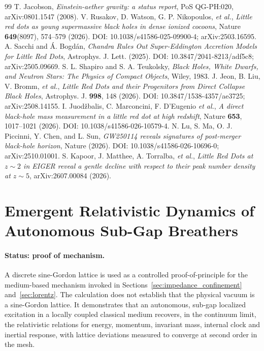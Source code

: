 \documentclass[11pt,a4paper]{article}
\theoremstyle{plain}
\theoremstyle{remark}
\begin{document}
\begin{thebibliography}{99}
 T. Jacobson, \emph{Einstein-aether gravity: a status report}, PoS QG-PH:020, arXiv:0801.1547 (2008).
 V. Rusakov, D. Watson, G. P. Nikopoulos, \emph{et al.}, \emph{Little red dots as young supermassive black holes in dense ionized cocoons}, Nature \textbf{649}(8097), 574--579 (2026). DOI: 10.1038/s41586-025-09900-4; arXiv:2503.16595.
 A. Sacchi and \'A. Bogd\'an, \emph{Chandra Rules Out Super-Eddington Accretion Models for Little Red Dots}, Astrophys. J. Lett. (2025). DOI: 10.3847/2041-8213/adf5c8; arXiv:2505.09669.
 S. L. Shapiro and S. A. Teukolsky, \textit{Black Holes, White Dwarfs, and Neutron Stars: The Physics of Compact Objects}, Wiley, 1983.
 J. Jeon, B. Liu, V. Bromm, \emph{et al.}, \emph{Little Red Dots and their Progenitors from Direct Collapse Black Holes}, Astrophys. J. \textbf{998}, 148 (2026). DOI: 10.3847/1538-4357/ae3725; arXiv:2508.14155.
 I. Juod\v{z}balis, C. Marconcini, F. D'Eugenio \emph{et al.}, \emph{A direct black-hole mass measurement in a little red dot at high redshift}, Nature \textbf{653}, 1017--1021 (2026). DOI: 10.1038/s41586-026-10579-4.
 N. Lu, S. Ma, O. J. Piccinni, Y. Chen, and L. Sun, \emph{GW250114 reveals signatures of post-merger black-hole horizon}, Nature (2026). DOI: 10.1038/s41586-026-10696-0; arXiv:2510.01001.
 S. Kapoor, J. Matthee, A. Torralba, \emph{et al.}, \emph{Little Red Dots at $z\sim2$ in EIGER reveal a gentle decline with respect to their peak number density at $z\sim5$}, arXiv:2607.00084 (2026).
\end{thebibliography}

\section{Emergent Relativistic Dynamics of Autonomous Sub-Gap Breathers}
\label{app:breathers}

\paragraph{Status: proof of mechanism.} A discrete sine-Gordon lattice is used as a controlled proof-of-principle for the medium-based mechanism invoked in Sections~\ref{sec:impedance_confinement} and~\ref{sec:lorentz}. The calculation does not establish that the physical vacuum is a sine-Gordon lattice. It demonstrates that an autonomous, sub-gap localized excitation in a locally coupled classical medium recovers, in the continuum limit, the relativistic relations for energy, momentum, invariant mass, internal clock and inertial response, with lattice deviations measured to converge at second order in the mesh.
\end{document}
